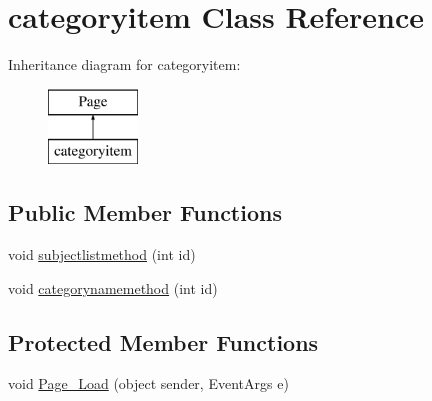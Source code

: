 \hypertarget{classcategoryitem}{}\section{categoryitem Class Reference}
\label{classcategoryitem}
Inheritance diagram for categoryitem\+:\begin{figure}[H]
\begin{center}
\leavevmode
\includegraphics[height=2.000000cm]{classcategoryitem}
\end{center}
\end{figure}
\subsection*{Public Member Functions}
\begin{DoxyCompactItemize}
\item 
void \mbox{\hyperlink{classcategoryitem_a9df534c2b7cea7fabd2f73e82c2e9d96}{subjectlistmethod}} (int id)
\item 
void \mbox{\hyperlink{classcategoryitem_a373048404961df6116c7e9608fafebac}{categorynamemethod}} (int id)
\end{DoxyCompactItemize}
\subsection*{Protected Member Functions}
\begin{DoxyCompactItemize}
\item 
void \mbox{\hyperlink{classcategoryitem_aa3296de18f1a812c2dda991dd40118b1}{Page\+\_\+\+Load}} (object sender, Event\+Args e)
\end{DoxyCompactItemize}
